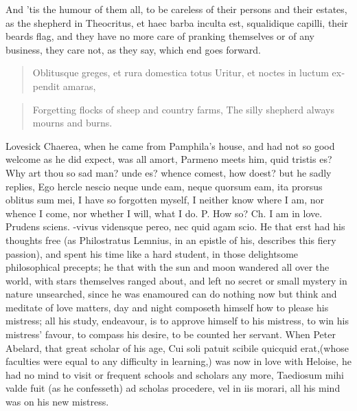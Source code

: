 And 'tis the humour of them all, to be careless of their persons and
their estates, as the shepherd in Theocritus, et haec barba
inculta est, squalidique capilli, their beards flag, and they have no
more care of pranking themselves or of any business, they care not, as
they say, which end goes forward.

\begin{latin}
\begin{verse}
Oblitusque greges, et rura domestica totus
Uritur, et noctes in luctum expendit amaras,
\end{verse}
\end{latin}
\translationrule%
\begin{verse}%
Forgetting flocks of sheep and country farms,
The silly shepherd always mourns and burns.
\end{verse}%

Lovesick Chaerea, when he came from Pamphila's house, and had not
so good welcome as he did expect, was all amort, Parmeno meets him,
quid tristis es? Why art thou so sad man? unde es? whence comest, how
doest? but he sadly replies, Ego hercle nescio neque unde eam, neque
quorsum eam, ita prorsus oblitus sum mei, I have so forgotten myself, I
neither know where I am, nor whence I come, nor whether I will, what I
do. P. How so? Ch. I am in love. Prudens sciens. -vivus
vidensque pereo, nec quid agam scio. He that erst had his
thoughts free (as Philostratus Lemnius, in an epistle of his, describes
this fiery passion), and spent his time like a hard student, in those
delightsome philosophical precepts; he that with the sun and moon
wandered all over the world, with stars themselves ranged about, and
left no secret or small mystery in nature unsearched, since he was
enamoured can do nothing now but think and meditate of love matters,
day and night composeth himself how to please his mistress; all his
study, endeavour, is to approve himself to his mistress, to win his
mistress' favour, to compass his desire, to be counted her servant.
When Peter Abelard, that great scholar of his age, Cui soli patuit
scibile quicquid erat,(whose faculties were equal to any
difficulty in learning,) was now in love with Heloise, he had no mind
to visit or frequent schools and scholars any more, Taediosum mihi
valde fuit (as he confesseth) ad scholas procedere, vel in iis
morari, all his mind was on his new mistress.

